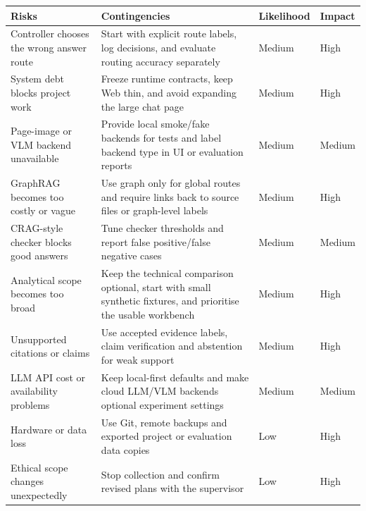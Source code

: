 \documentclass{article}
\begin{document}
\begin{tabularx}{\textwidth}{p{}X p{}p{}}
\toprule
\textbf{Risks} & \textbf{Contingencies} & \textbf{Likelihood} & \textbf{Impact} \\
\midrule
Controller chooses the wrong answer route & Start with explicit route labels, log decisions, and evaluate routing accuracy separately & Medium & High \\
System debt blocks project work & Freeze runtime contracts, keep Web thin, and avoid expanding the large chat page & Medium & High \\
Page-image or VLM backend unavailable & Provide local smoke/fake backends for tests and label backend type in UI or evaluation reports & Medium & Medium \\
GraphRAG becomes too costly or vague & Use graph only for global routes and require links back to source files or graph-level labels & Medium & High \\
CRAG-style checker blocks good answers & Tune checker thresholds and report false positive/false negative cases & Medium & Medium \\
Analytical scope becomes too broad & Keep the technical comparison optional, start with small synthetic fixtures, and prioritise the usable workbench & Medium & High \\
Unsupported citations or claims & Use accepted evidence labels, claim verification and abstention for weak support & Medium & High \\
LLM API cost or availability problems & Keep local-first defaults and make cloud LLM/VLM backends optional experiment settings & Medium & Medium \\
Hardware or data loss & Use Git, remote backups and exported project or evaluation data copies & Low & High \\
Ethical scope changes unexpectedly & Stop collection and confirm revised plans with the supervisor & Low & High \\
\bottomrule
\end{tabularx}
\end{document}
